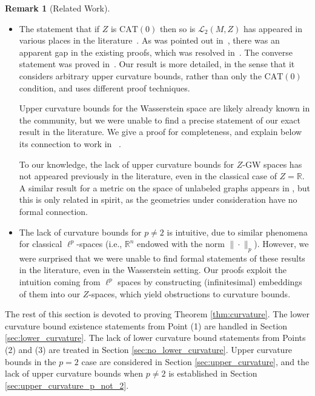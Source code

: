 \documentclass{article}
\theoremstyle{definition}
\newtheorem{remark}[proposition]{Remark}
\newcommand{\R}{\mathbb{R}}
\begin{document}
\begin{remark}[Related Work]
\begin{itemize}
    \item[(4)] The statement that if $Z$ is $\mathrm{CAT}(0)$ then so is $\mathcal{L}_2(M,Z)$ has appeared in various places in the literature~\cite{jost1994equilibrium,jost2012nonpositive,sturm2001nonlinear}. As was pointed out in~\cite[Remark 4.12]{serieys2026nonlinear}, there was an apparent gap in the existing proofs, which was resolved in~\cite[Proposition 4.11]{serieys2026nonlinear}. The converse statement was proved in~\cite[Proposition 4.13]{serieys2026nonlinear}. Our result is more detailed, in the sense that it considers arbitrary upper curvature bounds, rather than only the $\mathrm{CAT}(0)$ condition, and uses different proof techniques.

    Upper curvature bounds for the Wasserstein space are likely already known in the community, but we were unable to find a precise statement of our exact result in the literature. We give a proof for completeness, and explain below its connection to work in ~\cite{kloeckner2010geometric,bertrand2012geometric}.

    To our knowledge, the lack of upper curvature bounds for $Z$-GW spaces has not appeared previously in the literature, even in the classical case of $Z=\R$. A similar result for a metric on the space of unlabeled graphs appears in \cite[Theorem 1]{calissano2024populations}, but this is only related in spirit, as the geometries under consideration have no formal connection.

    \item[(3),(5)] The lack of curvature bounds for $p \neq 2$ is intuitive, due to similar phenomena for classical $\ell^p$-spaces (i.e., $\R^n$ endowed with the norm $\|\cdot\|_p$). However, we were surprised that we were unable to find formal statements of these results in the literature, even in the Wasserstein setting. Our proofs exploit the intuition coming from $\ell^p$ spaces by constructing (infinitesimal) embeddings of them into our $Z$-spaces, which yield obstructions to curvature bounds.   
\end{itemize}
\end{remark}


%
%
%

%
%
%



The rest of this section is devoted to proving Theorem \ref{thm:curvature}. The lower curvature bound existence statements from Point (1) are handled in Section \ref{sec:lower_curvature}. The lack of lower curvature bound statements from Points (2) and (3) are treated in Section \ref{sec:no_lower_curvature}. Upper curvature bounds in the $p=2$ case are considered in Section \ref{sec:upper_curvature}, and the lack of upper curvature bounds when $p \neq 2$ is established in Section \ref{sec:upper_curvature_p_not_2}.
\end{document}
